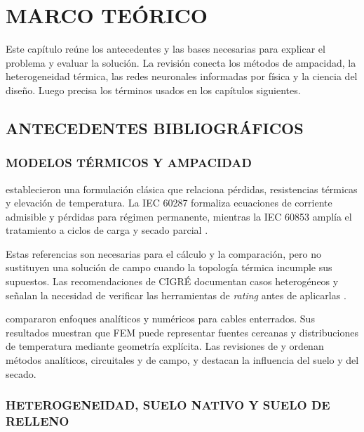 \chapter{MARCO TEÓRICO}
\label{ch:marco-teorico}

Este capítulo reúne los antecedentes y las bases necesarias para explicar el problema y evaluar la solución. La revisión conecta los métodos de ampacidad, la heterogeneidad térmica, las redes neuronales informadas por física y la ciencia del diseño. Luego precisa los términos usados en los capítulos siguientes.

\section{ANTECEDENTES BIBLIOGRÁFICOS}
\label{sec:antecedentes}

\subsection{MODELOS TÉRMICOS Y AMPACIDAD}

\textcite[752--772]{neher1957} establecieron una formulación clásica que relaciona pérdidas, resistencias térmicas y elevación de temperatura. La IEC 60287 formaliza ecuaciones de corriente admisible y pérdidas para régimen permanente, mientras la IEC 60853 amplía el tratamiento a ciclos de carga y secado parcial \parencites[cláusulas~4--5]{iec60287}[cláusulas~2--4]{iec60853}.

Estas referencias son necesarias para el cálculo y la comparación, pero no sustituyen una solución de campo cuando la topología térmica incumple sus supuestos. Las recomendaciones de CIGRÉ documentan casos heterogéneos y señalan la necesidad de verificar las herramientas de \textit{rating} antes de aplicarlas \parencite[3--4,41--42,93--99]{cigre2025}.

\textcite[1387--1400]{aras2005} compararon enfoques analíticos y numéricos para cables enterrados. Sus resultados muestran que FEM puede representar fuentes cercanas y distribuciones de temperatura mediante geometría explícita. Las revisiones de \textcite[4,11,17]{enescu2020} y \textcite[3--6]{enescu2021} ordenan métodos analíticos, circuitales y de campo, y destacan la influencia del suelo y del secado.

\subsection{HETEROGENEIDAD, SUELO NATIVO Y SUELO DE RELLENO}

